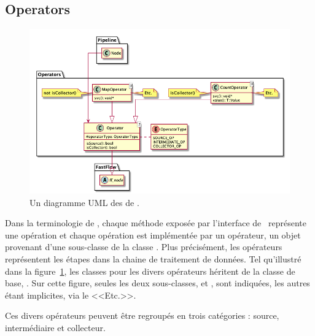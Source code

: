 \subsection{Operators}

\begin{figure}
\centering
         \includegraphics[width=1.0\textwidth]{Figures/operators-details.png}
      \caption{Un diagramme UML des  de \ppff.}
       \label{operators.fig}
\end{figure}


Dans la terminologie de , chaque m\'ethode expos\'ee par l'interface de \ppff\ repr\'esente une op\'eration et chaque op\'eration est impl\'ement\'ee par un op\'erateur, un objet provenant d'une sous-classe de la classe . Plus pr\'ecisément, les op\'erateurs repr\'esentent les \'etapes dans la chaine de traitement de donn\'ees. Tel qu'illustré dans la figure~\ref{operators.fig}, les classes pour les divers op\'erateurs h\'eritent de la classe de base, . 
%
Sur cette figure, seules les deux sous-classes,  et , sont indiqu\'ees, les autres \'etant implicites, via le <<Etc.>>.
%


Ces divers opérateurs peuvent \^etre regroupés en trois cat\'egories : source, interm\'ediaire et collecteur.

